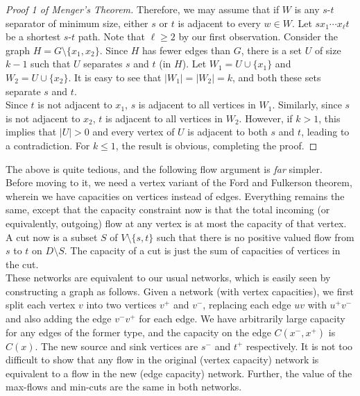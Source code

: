 \begin{proof}[Proof 1 of Menger's Theorem]
				Therefore, we may assume that if $W$ is any $s$-$t$ separator of minimum size, either $s$ or $t$ is adjacent to every $w \in W$. Let $s x_1 \cdots x_\ell t$ be a shortest $s$-$t$ path. Note that $\ell \ge 2$ by our first observation. Consider the graph $H = G \setminus \{x_1,x_2\}$. Since $H$ has fewer edges than $G$, there is a set $U$ of size $k-1$ such that $U$ separates $s$ and $t$ (in $H$). Let $W_1 = U \cup \{x_1\}$ and $W_2 = U \cup \{x_2\}$. It is easy to see that $|W_1| = |W_2| = k$, and both these sets separate $s$ and $t$.\\
				Since $t$ is not adjacent to $x_1$, $s$ is adjacent to all vertices in $W_1$. Similarly, since $s$ is not adjacent to $x_2$, $t$ is adjacent to all vertices in $W_2$. However, if $k>1$, this implies that $|U|>0$ and every vertex of $U$ is adjacent to both $s$ and $t$, leading to a contradiction. For $k \le 1$, the result is obvious, completing the proof.
			\end{proof}

			The above is quite tedious, and the following flow argument is \emph{far} simpler.\\

			Before moving to it, we need a vertex variant of the Ford and Fulkerson theorem, wherein we have capacities on vertices instead of edges. Everything remains the same, except that the capacity constraint now is that the total incoming (or equivalently, outgoing) flow at any vertex is at most the capacity of that vertex.\\
			A cut now is a subset $S$ of $V \setminus \{s,t\}$ such that there is no positive valued flow from $s$ to $t$ on $D\setminus S$. The capacity of a cut is just the sum of capacities of vertices in the cut.\\

			These networks are equivalent to our usual networks, which is easily seen by constructing a graph as follows. Given a network (with vertex capacities), we first split each vertex $v$ into two vertices $v^+$ and $v^-$, replacing each edge $uv$ with $u^+ v^-$ and also adding the edge $v^- v^+$ for each edge. We have arbitrarily large capacity for any edges of the former type, and the capacity on the edge $C(x^-, x^+)$ is $C(x)$. The new source and sink vertices are $s^-$ and $t^+$ respectively. It is not too difficult to show that any flow in the original (vertex capacity) network is equivalent to a flow in the new (edge capacity) network. Further, the value of the max-flows and min-cuts are the same in both networks.\\

